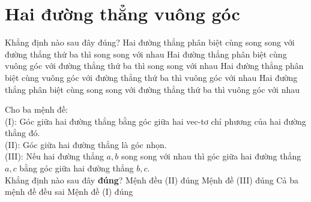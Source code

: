 \section{Hai đường thẳng vuông góc}
\begin{ex}%
	Khẳng định nào sau đây đúng?
	\choice
	{\True Hai đường thẳng phân biệt cùng song song với đường thẳng thứ ba thì song song với nhau}
	{Hai đường thẳng phân biệt cùng vuông góc với đường thẳng thứ ba thì song song với nhau}
	{Hai đường thẳng phân biệt cùng vuông góc với đường thẳng thứ ba thì vuông góc với nhau}
	{Hai đường thẳng phân biệt cùng song song với đường thẳng thứ ba thì vuông góc với nhau}
\end{ex}
\begin{ex}%
	Cho ba mệnh đề:\\
	(I): Góc giữa hai đường thẳng bằng góc giữa hai vec-tơ chỉ phương của hai đường thẳng đó.\\
	(II): Góc giữa hai đường thẳng là góc nhọn.\\
	(III): Nếu hai đường thẳng $a,b$ song song với nhau thì góc giữa hai đường thẳng $a,c$ bằng góc giữa hai đường thẳng $b,c$.\\
	Khẳng định nào sau đây \textbf{đúng}?
	\choice
	{Mệnh đều (II) đúng}
	{\True Mệnh đề (III) đúng}
	{Cả ba mệnh đề đều sai}
	{Mệnh đề (I) đúng}
\end{ex}
